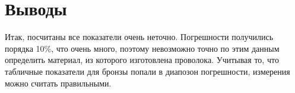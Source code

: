 \section{Выводы}

Итак, посчитаны все показатели очень неточно. Погрешности получились
порядка 10\%, что очень много, поэтому невозможно точно по этим данным
определить материал, из которого изготовлена проволока. Учитывая то,
что табличные показатели для бронзы попали в диапозон погрешности,
измерения можно считать правильными.
